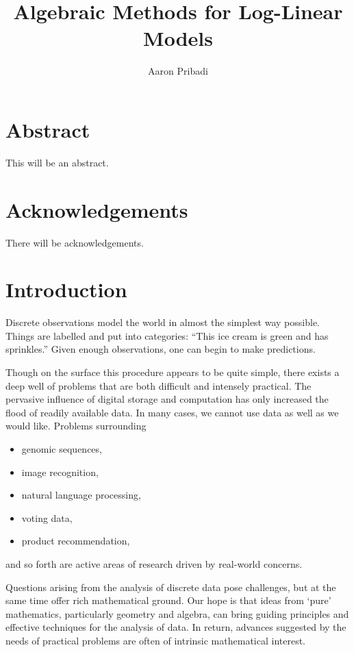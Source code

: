 \documentclass[cclicense]{hmcthesis}
\title{Algebraic Methods for Log-Linear Models}
\author{Aaron Pribadi}
\numberwithin{equation}{chapter}
\numberwithin{ucounter}{chapter}
\begin{document}
\frontmatter

\maketitle

\tableofcontents


\chapter{Abstract}
    This will be an abstract.

\chapter{Acknowledgements}
    There will be acknowledgements.

\mainmatter

\chapter{Introduction}

    Discrete observations model the world in almost the simplest way possible.
    Things are labelled and put into categories: ``This ice cream is green and
    has sprinkles.''  Given enough observations, one can begin to make
    predictions.
    
    Though on the surface this procedure appears to be quite simple, there
    exists a deep well of problems that are both difficult and intensely
    practical.  The pervasive influence of digital storage and computation has
    only increased the flood of readily available data.  In many cases, we
    cannot use data as well as we would like.  Problems surrounding 
    \begin{itemize}\noparspace
    \item genomic sequences,
    \item image recognition, 
    \item natural language processing,
    \item voting data, 
    \item product recommendation, 
    \end{itemize}
    and so forth are active areas of research driven by real-world concerns.

    Questions arising from the analysis of discrete data pose challenges, but at
    the same time offer rich mathematical ground.  Our hope is that ideas
    from `pure' mathematics, particularly geometry and algebra, can bring
    guiding principles and effective techniques for the analysis of data.  In
    return, advances suggested by the needs of practical problems are often of
    intrinsic mathematical interest.
    
\end{document}

